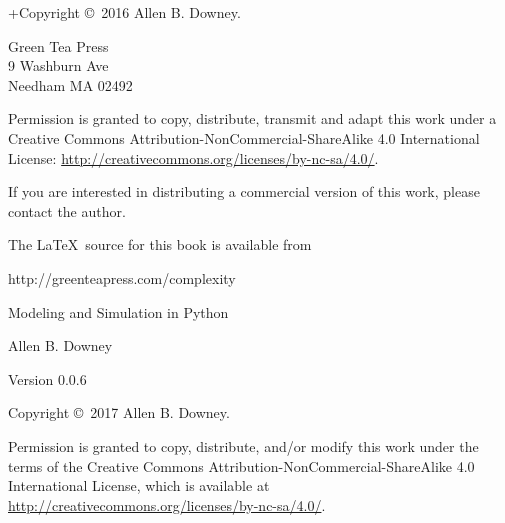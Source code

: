 \documentclass[12pt]{book}
\newcommand{\thetitle}{Modeling and Simulation in Python}
\newcommand{\theauthors}{Allen B. Downey}
\newcommand{\theversion}{0.0.6}
\theoremstyle{exercise}
\begin{document}
\begin{latexonly}
\begin{flushright}
\end{flushright}


\pagebreak
\thispagestyle{empty}

+Copyright \copyright ~2016 \theauthors.



\vspace{0.2in}

\begin{flushleft}
Green Tea Press       \\
9 Washburn Ave \\
Needham MA 02492
\end{flushleft}

Permission is granted to copy, distribute, transmit and adapt this work under a Creative Commons Attribution-NonCommercial-ShareAlike 4.0 International License: \url{http://creativecommons.org/licenses/by-nc-sa/4.0/}.

If you are interested in distributing a commercial version of this
work, please contact the author.

The \LaTeX\ source for this book is available from

\begin{code}
      http://greenteapress.com/complexity
\end{code}


\cleardoublepage
\setcounter{tocdepth}{1}
\tableofcontents

\end{latexonly}



\begin{htmlonly}

\vspace{1em}

{\Large \thetitle}

{\large \theauthors}

Version \theversion

\vspace{1em}

Copyright \copyright ~2017 \theauthors.

Permission is granted to copy, distribute, and/or modify this work
under the terms of the Creative Commons
Attribution-NonCommercial-ShareAlike 4.0 International License, which is
available at \url{http://creativecommons.org/licenses/by-nc-sa/4.0/}.

\vspace{1em}

\setcounter{chapter}{-1}

\end{htmlonly}
\end{document}
